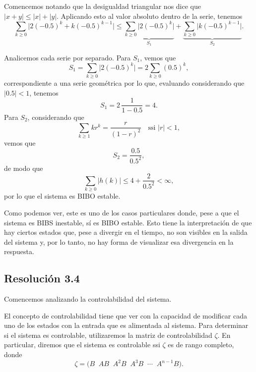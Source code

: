 \documentclass[
  11pt,
  letterpaper,
   addpoints,
  answers
  ]{exam}
\begin{document}
\begin{questions}
\begin{solution}
Comencemos notando que la desigualdad triangular nos dice que $|x+y|\le |x|+|y|$. Aplicando esto al valor absoluto dentro de la serie, tenemos
\begin{equation}
\sum_{k\ge 0} \big| 2(-0.5)^{k}+k(-0.5)^{k-1} \big|
\le
\underbrace{\sum_{k\ge 0} \big| 2(-0.5)^{k}\big|}_{S_{1}}
+
\underbrace{\sum_{k\ge 0} \big| k(-0.5)^{k-1} \big|}_{S_{2}}.
\tag{13}
\end{equation}

Analicemos cada serie por separado. Para $S_{1}$, vemos que
\begin{equation}
S_{1}=\sum_{k\ge 0} \big|2(-0.5)^{k}\big|
=2\sum_{k\ge 0} (0.5)^{k},
\tag{14}
\end{equation}
correspondiente a una serie geométrica por lo que, evaluando considerando que $|0.5|<1$, tenemos
\begin{equation}
S_{1}=2\,\frac{1}{1-0.5}=4.
\tag{15}
\end{equation}
Para $S_{2}$, considerando que
\begin{equation}
\sum_{k\ge 1} k r^{k} = \frac{r}{(1-r)^{2}}\quad \text{ssi } |r|<1,
\end{equation}
vemos que
\begin{equation}
S_{2}=\frac{0.5}{0.5^{2}},
\tag{16}
\end{equation}
de modo que
\begin{equation}
\sum_{k\ge 0} |h(k)| \le 4 + \frac{2}{0.5^{2}} < \infty,
\tag{18}
\end{equation}
por lo que el sistema es BIBO estable.

Como podemos ver, este es uno de los casos particulares donde, pese a que el sistema es BIBS inestable, sí es BIBO estable. Esto tiene la interpretación de que hay ciertos estados que, pese a divergir en el tiempo, no son visibles en la salida del sistema y, por lo tanto, no hay forma de visualizar esa divergencia en la respuesta.

\subsection*{Resolución 3.4}

Comencemos analizando la controlabilidad del sistema.

El concepto de controlabilidad tiene que ver con la capacidad de modificar cada uno de los estados con la entrada que es alimentada al sistema. Para determinar si el sistema es controlable, utilizaremos la matriz de controlabilidad $\zeta$. En particular, diremos que el sistema es controlable ssi $\zeta$ es de rango completo, donde
\begin{equation}
\zeta=\big( B\;\; AB\;\; A^{2}B\;\; A^{3}B\;\; \cdots\;\; A^{n-1}B \big).
\tag{19}
\end{equation}


\end{solution}
\end{questions}
\end{document}
